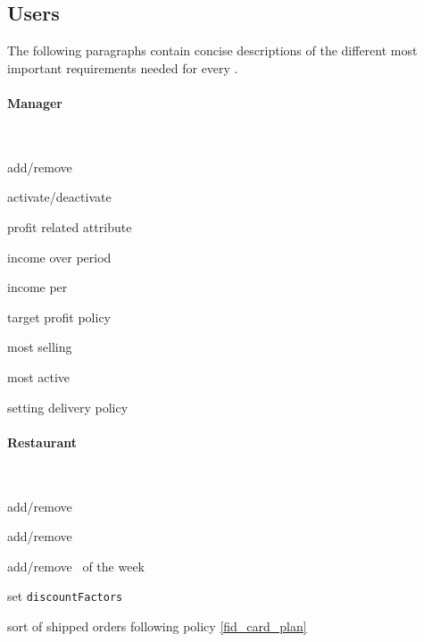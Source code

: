 \subsection{Users} %
\label{sub:users}
The following paragraphs contain concise descriptions
of the different most important requirements needed for every \User.


\paragraph{Manager}~\vspace{0.3\baselineskip}
\begin{itemize}
  \begin{minipage}{0.47\linewidth}
    \item add/remove \User
    \item activate/deactivate \User
    \item profit related attribute
    \item income over period
    \item income per \Customer
  \end{minipage}
  \begin{minipage}{0.53\linewidth}
    \item target profit policy
    \item most selling \Restaurant
    \item most active \Courier
    \item setting delivery policy
  \end{minipage}
\end{itemize}

\paragraph*{Restaurant}~\vspace{0.3\baselineskip}
\begin{itemize}
  \begin{minipage}{0.47\linewidth}
    \item add/remove \Dish
    \item add/remove \Meal
    \item add/remove \Meal~of the week
  \end{minipage}
  \begin{minipage}{0.53\linewidth}
    \item set \lstinline|discountFactors|
    \item sort of shipped orders following policy \ref{fid_card_plan}
  \end{minipage}
\end{itemize}

